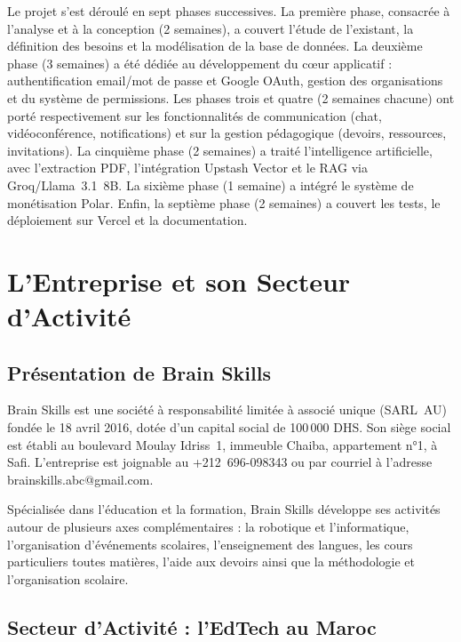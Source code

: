 \documentclass[12pt, a4paper, twoside]{report}
\begin{document}
Le projet s'est déroulé en sept phases successives. La première phase, consacrée
à l'analyse et à la conception (2 semaines), a couvert l'étude de l'existant,
la définition des besoins et la modélisation de la base de données. La deuxième
phase (3 semaines) a été dédiée au développement du cœur applicatif : authentification
email/mot de passe et Google OAuth, gestion des organisations et du système de
permissions. Les phases trois et quatre (2 semaines chacune) ont porté
respectivement sur les fonctionnalités de communication (chat, vidéoconférence,
notifications) et sur la gestion pédagogique (devoirs, ressources, invitations).
La cinquième phase (2 semaines) a traité l'intelligence artificielle, avec
l'extraction PDF, l'intégration Upstash Vector et le RAG via Groq/Llama~3.1~8B.
La sixième phase (1 semaine) a intégré le système de monétisation Polar. Enfin,
la septième phase (2 semaines) a couvert les tests, le déploiement sur Vercel et
la documentation.

 

\chapter{L'Entreprise et son Secteur d'Activité}

\section{Présentation de Brain Skills}

Brain Skills est une société à responsabilité limitée à associé unique (SARL~AU)
fondée le 18 avril 2016, dotée d'un capital social de 100\,000 DHS. Son siège
social est établi au boulevard Moulay Idriss~1\ier, immeuble Chaiba, appartement
n°1, à Safi. L'entreprise est joignable au +212~696-098343 ou par courriel à
l'adresse brainskills.abc@gmail.com.

Spécialisée dans l'éducation et la formation, Brain Skills développe ses activités
autour de plusieurs axes complémentaires : la robotique et l'informatique,
l'organisation d'événements scolaires, l'enseignement des langues, les cours
particuliers toutes matières, l'aide aux devoirs ainsi que la méthodologie et
l'organisation scolaire.

\section{Secteur d'Activité : l'EdTech au Maroc}
\end{document}
